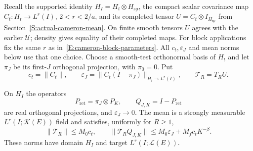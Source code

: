 Recall the supported identity $H_I = H_t\otimes H_{\mathrm{sp}}$, the compact
scalar covariance map $C_t:H_t \to L^r(I)$, $2 < r < 2/a$, and its completed
tensor $U = C_t\otimes I_{H_{\mathrm{sp}}}$ from
Section~\ref{S:actual-cameron-mean}. On finite smooth tensors $U$ agrees with
the earlier $\mathcal{U}$; density gives equality of their completed maps. For
block applications fix the same $r$ as in~\eqref{E:cameron-block-parameters}.
All $c_t,\varepsilon_J$ and mean norms below use that one choice. Choose a
smooth-test orthonormal basis of $H_t$ and let $\pi_J$ be its first-$J$
orthogonal projection, with $\pi_0 = 0$. Put
\[
  c_t=\|C_t\|,\qquad
  \varepsilon_J=\|C_t(I-\pi_J)\|_{H_t\to L^r(I)},\qquad
  \mathcal{T}_R=T_RU .
\]
%
\begin{proposition}
  \label{P:uniform-mean-regulator}
  On $H_I$ the operators
  \[
    P_{\mathrm{ret}}=\pi_J\otimes P_K,\qquad
    Q_{J,K}=I-P_{\mathrm{ret}}
  \]
  are real orthogonal projections, and $\varepsilon_J \to 0$. The mean is a
  strongly measurable $L^r(I;\mathcal{K}(E))$ field and satisfies, uniformly for
  $R \ge 1$,
  \begin{equation}\label{E:uniform-completed-mean}
    \|\mathcal{T}_R\|\le M_0c_t,\qquad
    \|\mathcal{T}_RQ_{J,K}\|
    \le M_0\varepsilon_J+M_fc_tK^{-\beta}.
  \end{equation}
  These norms have domain $H_I$ and target $L^r(I;\mathcal{L}(E))$.
\end{proposition}

